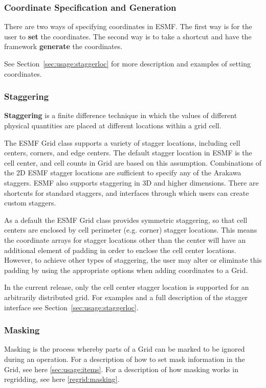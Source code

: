 \subsubsection{Coordinate Specification and Generation}

There are two ways of specifying coordinates in ESMF.  The
first way is for the user to {\bf set} the coordinates.  The second 
way is to take a shortcut and have the framework {\bf generate}
the coordinates.  

See Section~\ref{sec:usage:staggerloc} for more description and examples of
setting coordinates.

\subsubsection{Staggering}

{\bf Staggering} is a finite difference technique in which the values 
of different physical quantities are placed at different locations
within a grid cell. 

The ESMF Grid class supports a variety of stagger locations, including
cell centers, corners, and edge centers. The default stagger location in 
ESMF is the cell center, and cell counts in Grid are based on this assumption.
Combinations of the 2D ESMF stagger locations are sufficient to specify any of the
Arakawa staggers.  ESMF also supports staggering in 3D and higher dimensions.
There are shortcuts for standard staggers, and interfaces through which users 
can create custom staggers.  

As a default the ESMF Grid class provides symmetric staggering, so
that cell centers are enclosed by cell perimeter (e.g. corner) 
stagger locations. This means the coordinate arrays for stagger
locations other than the center will have an additional element of 
padding in order to enclose the cell center locations.
However, to achieve other types of staggering, the user may alter 
or eliminate this padding by using the appropriate options when adding
coordinates to a Grid. 
 
In the current release, only the cell center stagger location is supported for an
arbitrarily distributed grid. For examples and a full description of the stagger interface 
see Section~\ref{sec:usage:staggerloc}. 

\subsubsection{Masking}

Masking is the process whereby parts of a Grid can be marked to be
ignored during an operation.  For a description of how to set mask information in
the Grid, see here \ref{sec:usage:items}. For a description of how masking works
in regridding, see here \ref{regrid:masking}.
